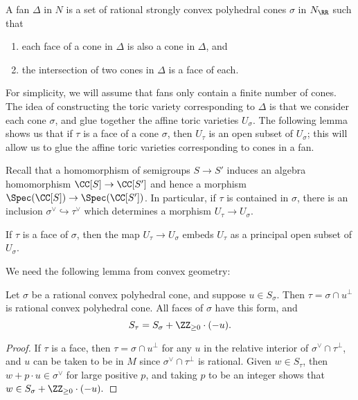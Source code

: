 \begin{definition}
A fan $\Delta$ in $N$ is a set of rational strongly convex polyhedral cones $\sigma$ in $N_\RR$ such that
\begin{enumerate}
\item
each face of a cone in $\Delta$ is also a cone in $\Delta$, and
\item
the intersection of two cones in $\Delta$ is a face of each.
\end{enumerate}
\end{definition}

For simplicity, we will assume that fans only contain a finite number of cones.
The idea of constructing the toric variety corresponding to $\Delta$ is that we consider each cone $\sigma$, and glue together the affine toric varieties $U_\sigma$.
The following lemma shows us that if $\tau$ is a face of a cone $\sigma$, then $U_\tau$ is an open subset of $U_\sigma$;
this will allow us to glue the affine toric varieties corresponding to cones in a fan.

Recall that a homomorphism of semigroups $S \to S'$ induces an algebra homomorphism $\CC[S] \to \CC[S']$ and hence a morphism $\Spec(\CC[S]) \to \Spec(\CC[S'])$.
In particular, if $\tau$ is contained in $\sigma$, there is an inclusion $\sigma^\vee \hookrightarrow \tau^\vee$ which determines a morphism $U_\tau \to U_\sigma$.

\begin{proposition}\label{faceembedding}
If $\tau$ is a face of $\sigma$, then the map $U_\tau \to U_\sigma$ embeds $U_\tau$ as a principal open subset of $U_\sigma$.
\end{proposition}

We need the following lemma from convex geometry:

\begin{lemma}
Let $\sigma$ be a rational convex polyhedral cone, and suppose $u \in S_\sigma$.
Then $\tau = \sigma \cap u^\perp$ is rational convex polyhedral cone. 
All faces of $\sigma$ have this form, and
$$S_\tau = S_\sigma + \ZZ_{\ge 0} \cdot (-u).$$
\end{lemma}
\begin{proof}
If $\tau$ is a face, then $\tau = \sigma \cap u^\perp$ for any $u$ in the relative interior of $\sigma^\vee \cap \tau^\perp$, and $u$ can be taken to be in $M$ since $\sigma^\vee \cap \tau^\perp$ is rational.
Given $w\in S_\tau$, then $w + p \cdot u \in \sigma^\vee$ for large positive $p$, and taking $p$ to be an integer shows that $w \in S_\sigma + \ZZ_{\ge 0} \cdot (-u).$
\end{proof}

